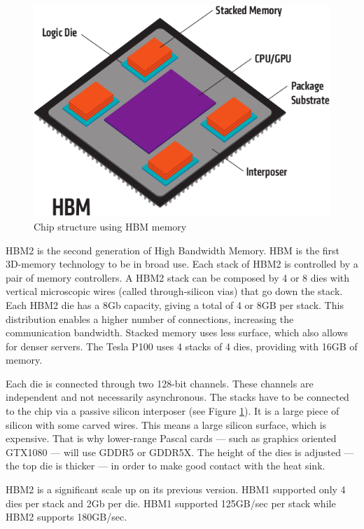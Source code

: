 \begin{figure}[ht!]
    \centering
    \includegraphics[width=\linewidth]{hbm}
    \caption{Chip structure using HBM memory \cite{amd:hbm}}
    \label{fig:hbm}
\end{figure}
HBM2 is the second generation of High Bandwidth Memory.
HBM is the first 3D-memory technology to be in broad use.
Each stack of HBM2 is controlled by a pair of memory controllers.
A HBM2 stack can be composed by 4 or 8 dies with vertical microscopic wires (called through-silicon vias) that go down the stack.
Each HBM2 die has a 8Gb capacity, giving a total of 4 or 8GB per stack.
This distribution enables a higher number of connections, increasing the communication bandwidth.
Stacked memory uses less surface, which also allows for denser servers.
The Tesla P100 uses 4 stacks of 4 dies, providing with 16GB of memory.

Each die is connected through two 128-bit channels.
These channels are independent and not necessarily asynchronous.
The stacks have to be connected to the chip via a passive silicon interposer (see Figure \ref{fig:hbm}).
It is a large piece of silicon with some carved wires.
This means a large silicon surface, which is expensive.
That is why lower-range Pascal cards --- such as graphics oriented GTX1080 --- will use GDDR5 or GDDR5X.
The height of the dies is adjusted --- the top die is thicker --- in order to make good contact with the heat sink.

HBM2 is a significant scale up on its previous version.
HBM1 supported only 4 dies per stack and 2Gb per die.
HBM1 supported 125GB/sec per stack while HBM2 supports 180GB/sec.

